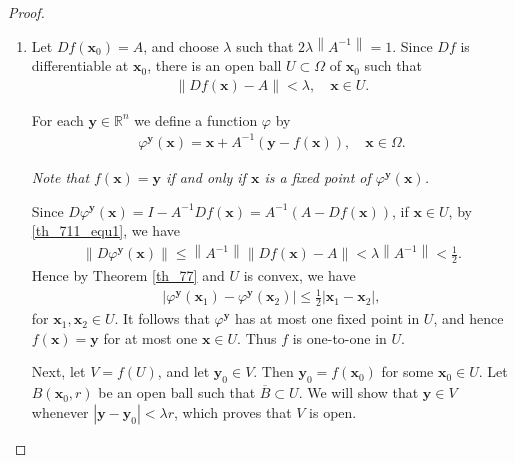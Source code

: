 \documentclass[11pt]{book}
\theoremstyle{definition}
\numberwithin{equation}{chapter}
\begin{document}
\begin{proof}
~\begin{enumerate}[label=(\alph*)]
    \item Let $Df(\mathbf{x}_0) = A$, and choose $\lambda$ such that $2 \lambda \left\|A^{-1}\right\| = 1$. Since $Df$ is differentiable at $\mathbf{x}_0$, there is an open ball $U \subset \Omega$ of $\mathbf{x}_0$ such that 
    \begin{align}\label{th_711_equ1}
        \left\|Df(\mathbf{x}) - A\right\| < \lambda, \quad \mathbf{x} \in U.
    \end{align}
    
    For each $\mathbf{y} \in \mathbb{R}^n$ we define a function $\varphi$ by
    \begin{align*}
        \varphi^{\mathbf{y}}(\mathbf{x}) = \mathbf{x} + A^{-1} \left(\mathbf{y} - f(\mathbf{x})\right), \quad \mathbf{x} \in \Omega.
    \end{align*}
    
    {\em Note that $f(\mathbf{x}) = \mathbf{y}$ if and only if $\mathbf{x}$ is a fixed point of $\varphi^{\mathbf{y}}(\mathbf{x})$.} 
    
    Since $D\varphi^{\mathbf{y}}(\mathbf{x}) = I - A^{-1} Df(\mathbf{x}) = A^{-1}\left(A - Df(\mathbf{x})\right)$, if $\mathbf{x} \in U$, by \ref{th_711_equ1}, we have
    \begin{align*}
        \left\|D\varphi^{\mathbf{y}}(\mathbf{x})\right\| \leq \left\|A^{-1}\right\| \left\|Df(\mathbf{x}) - A\right\| < \lambda \left\|A^{-1}\right\| < \frac{1}{2}.
    \end{align*}
    Hence by Theorem \ref{th_77} and $U$ is convex, we have
    \begin{align}\label{th_711_equ2}
        \left|\varphi^{\mathbf{y}}(\mathbf{x}_1) - \varphi^{\mathbf{y}}(\mathbf{x}_2)\right| \leq \frac{1}{2} \left|\mathbf{x}_1 - \mathbf{x}_2\right|,
    \end{align}
    for $\mathbf{x}_1, \mathbf{x}_2 \in U$. It follows that $\varphi^{\mathbf{y}}$ has at most one fixed point in $U$, and hence $f(\mathbf{x}) = \mathbf{y}$ for at most one $\mathbf{x} \in U$. Thus $f$ is one-to-one in $U$.
    
    \medskip
    
    Next, let $V = f(U)$, and let $\mathbf{y}_0 \in V$. Then $\mathbf{y}_0 = f(\mathbf{x}_0)$ for some $\mathbf{x}_0 \in U$. Let $B(\mathbf{x}_0,r)$ be an open ball such that $\overline{B} \subset U$. We will show that $\mathbf{y} \in V$ whenever $\left|\mathbf{y} - \mathbf{y}_0\right| < \lambda r$, which proves that $V$ is open.
    

\end{enumerate}
\end{proof}
\end{document}
